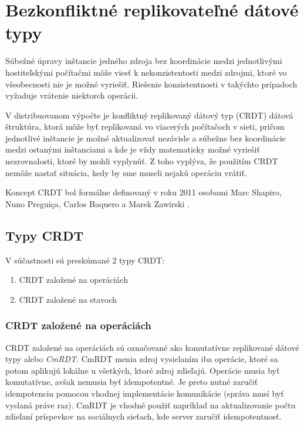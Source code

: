 \chapter{Bezkonfliktné replikovateľné dátové typy}

\label{kap:cdrt} %


Súbežné úpravy inštancie jedného zdroja bez koordinácie medzi jednotlivými hostiteľskými
počítačmi môže viesť k nekonzistentosti medzi zdrojmi, ktoré vo všeobecnosti nie je možné
vyriešiť. Riešenie konzistentnosti v takýchto prípadoch vyžaduje vrátenie niektorch operácii.

V distribuovanom výpočte je konfliktný replikovaný dátový typ (CRDT) dátová štruktúra,
ktorá môže byť replikovaná vo viacerých počítačoch v sieti, pričom jednotlivé inštancie je možné
aktualizovať nezávisle a súbežne bez koordinácie medzi ostanými inštanciami a kde je vždy
matematicky možné vyriešiť nezrovnalosti, ktoré by mohli vyplynúť. Z toho vyplýva, že použitím
CRDT nemôže nastať situácia, kedy by sme museli nejakú operáciu vrátiť. 

Koncept CRDT bol formálne definovaný v roku 2011 osobami
Marc Shapiro, Nuno Preguiça, Carlos Baquero a Marek Zawirski \cite{crdt_definition}.

\section{Typy CRDT}
V súčastnosti sú preskúmané 2 typy CRDT:
\begin{enumerate}
  \item CRDT založené na operáciách
  \item CRDT založené na stavoch
\end{enumerate}

\subsection{CRDT založené na operáciách}
CRDT založené na operáciách sú označované ako komutatívne replikované dátové typy alebo 
\textit{CmRDT}. CmRDT menia zdroj vysielaním iba operácie, ktoré sa potom aplikujú lokálne
u všetkých, ktoré zdroj zdieľajú. Operácie musia byť komutatívne, avšak nemusia 
byť idempotentné. Je preto nutné zaručiť idempotenciu pomocou vhodnej implementácie
komunikácie (správa musí byť vyslaná práve raz). 
CmRDT je vhodné použiť napríklad na aktualizovanie počtu zdieľaní
príspevkov na sociálnych sieťach, kde server zaručiť idempotentnosť. 

